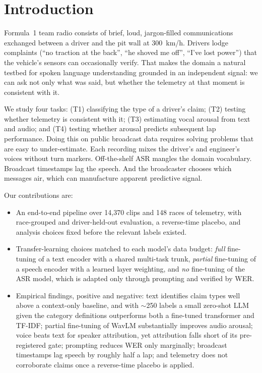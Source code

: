 \section{Introduction}
\label{sec:intro}

Formula~1 team radio consists of brief, loud, jargon-filled communications exchanged between a driver and the pit wall at 300\, km/h. Drivers lodge complaints (``no traction at the back'', ``he shoved me off'', ``I've lost power'') that the vehicle's sensors can occasionally verify. That makes the domain a natural testbed for spoken language understanding grounded in an independent signal: we can ask not only what was said, but whether the telemetry at that moment is consistent with it.

We study four tasks: (T1) classifying the type of a driver's claim; (T2) testing whether telemetry is consistent with it; (T3) estimating vocal arousal from text and audio; and (T4) testing whether arousal predicts subsequent lap performance. Doing this on public broadcast data requires solving problems that are easy to under-estimate. Each recording mixes the driver's and engineer's voices without turn markers. Off-the-shelf ASR mangles the domain vocabulary. Broadcast timestamps lag the speech. And the broadcaster chooses which messages air, which can manufacture apparent predictive signal.

Our contributions are:
\begin{itemize}
\item An end-to-end pipeline over 14{,}370 clips and 148 races of telemetry, with race-grouped and driver-held-out evaluation, a reverse-time placebo, and analysis choices fixed before the relevant labels existed.
\item Transfer-learning choices matched to each model's data budget: \emph{full} fine-tuning of a text encoder with a shared multi-task trunk, \emph{partial} fine-tuning of a speech encoder with a learned layer weighting, and \emph{no} fine-tuning of the ASR model, which is adapted only through prompting and verified by WER.
\item Empirical findings, positive and negative: text identifies claim types well above a context-only baseline, and with $\sim$250 labels a small zero-shot LLM given the category definitions outperforms both a fine-tuned transformer and TF-IDF; partial fine-tuning of WavLM substantially improves audio arousal; voice beats text for speaker attribution, yet attribution falls short of its pre-registered gate; prompting reduces WER only marginally; broadcast timestamps lag speech by roughly half a lap; and telemetry does not corroborate claims once a reverse-time placebo is applied.
\end{itemize}
